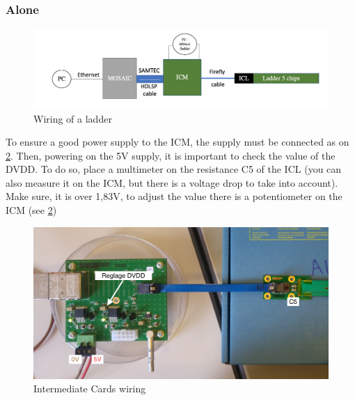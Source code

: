 \documentclass[12pt,oneside,a4]{article}
\begin{document}
        \subsubsection{Alone}
        \begin{figure}[h]
        \centering
        \includegraphics[scale =0.5]{figures/Wiring_ladder.png}
        \caption{Wiring of a ladder}
        \label{fig:6}
    \end{figure}
    
To ensure a good power supply to the ICM, the supply must be connected as on \ref{fig:7}. Then, powering on the 5V supply, it is important to check the value of the DVDD. To do so, place a multimeter on the resistance C5 of the ICL (you can also measure it on the ICM, but there is a voltage drop to take into account). Make sure, it is over 1,83V, to adjust the value there is a potentiometer on the ICM (see \ref{fig:7})

\begin{figure}[h]
        \centering
        \includegraphics[scale =0.8]{figures/Alimentation.png}
        \caption{Intermediate Cards wiring}
        \label{fig:7}
\end{figure}
\end{document}
